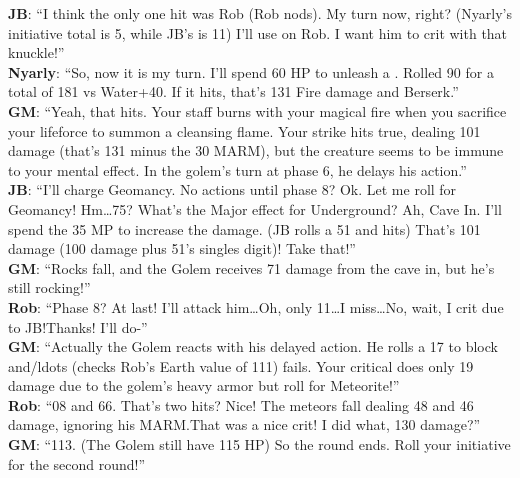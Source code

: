\begin{multimog}
\textbf{JB}: \enquote{I think the only one hit was Rob (Rob nods). My turn now, right? (Nyarly's initiative total is 5, while JB's is 11) I'll use  on Rob. I want him to crit with that knuckle!} \\
\textbf{Nyarly}: \enquote{So, now it is my turn. I'll spend 60 HP to unleash a . Rolled 90 for a total of 181 vs Water+40. If it hits, that's 131 Fire damage and Berserk.} \\
\textbf{GM}: \enquote{Yeah, that hits. Your staff burns with your magical fire when you sacrifice your lifeforce to summon a cleansing flame. Your strike hits true, dealing 101 damage (that's 131 minus the 30 MARM), but the creature seems to be immune to your mental effect. In the golem's turn at phase 6, he delays his action.} \\
\textbf{JB}: \enquote{I'll charge Geomancy. No actions until phase 8? Ok. Let me roll for Geomancy! Hm\ldots 75? What’s the Major effect for Underground? Ah, Cave In. I'll spend the 35 MP to increase the damage. (JB rolls a 51 and hits) That's 101 damage (100 damage plus 51's singles digit)! Take that!} \\
\textbf{GM}: \enquote{Rocks fall, and the Golem receives 71 damage from the cave in, but he's still rocking!} \\
\textbf{Rob}: \enquote{Phase 8? At last! I'll attack him\ldots Oh, only 11\ldots I miss\ldots No, wait, I crit due to JB!\@{}Thanks! I'll do-} \\
\textbf{GM}: \enquote{Actually the Golem reacts with his delayed action. He rolls a 17 to block and/ldots (checks Rob's Earth value of 111) fails. Your critical does only 19 damage due to the golem's heavy armor but roll for Meteorite!} \\
\textbf{Rob}: \enquote{08 and 66. That's two hits? Nice! The meteors fall dealing 48 and 46 damage, ignoring his MARM.\@{}That was a nice crit! I did what, 130 damage?} \\
\textbf{GM}: \enquote{113. (The Golem still have 115 HP) So the round ends. Roll your initiative for the second round!} \\ 
\end{multimog}

